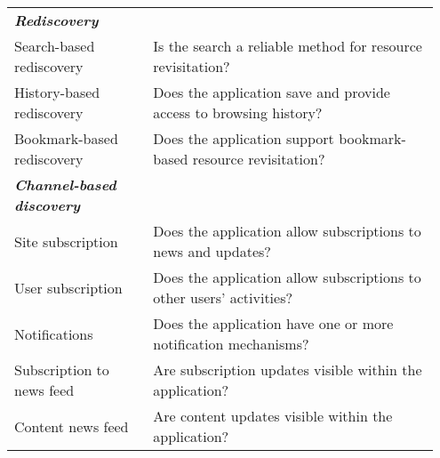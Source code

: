 \begin{table*}[ht!]
\begin{tabular}{|p{0.31\linewidth}|p{0.64\linewidth}|}
\emph{\textbf{Rediscovery}}                     &                                                                                                           \\
Search-based rediscovery     & Is the search a reliable method for resource revisitation?                             \\
History-based rediscovery    & Does the application save and provide access to browsing history?                                        \\
Bookmark-based rediscovery   & Does the application support bookmark-based resource revisitation?                                        \\


\emph{\textbf{Channel-based discovery}}          &                                                                                                           \\
Site subscription            & Does the application allow subscriptions to news and updates?                                             \\
User subscription             & Does the application allow subscriptions to other users' activities?                                      \\
Notifications                & Does the application have one or more notification mechanisms?                                                      \\
Subscription to news feed                  & Are subscription updates visible within the application?  \\
Content news feed                  & Are content updates visible within the application? \\

\hline     

         
\end{tabular}
\end{table*}


